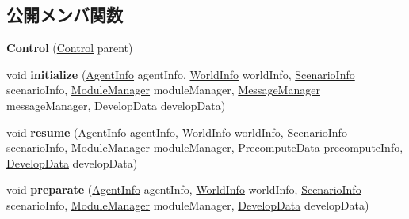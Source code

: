 \subsection*{公開メンバ関数}
\begin{DoxyCompactItemize}
\item 
\hypertarget{classadf_1_1component_1_1control_1_1Control_aeaab5064a2bfb271229b3b62a91c471c}{}\label{classadf_1_1component_1_1control_1_1Control_aeaab5064a2bfb271229b3b62a91c471c} 
{\bfseries Control} (\hyperlink{classadf_1_1component_1_1control_1_1Control}{Control} parent)
\item 
\hypertarget{classadf_1_1component_1_1control_1_1Control_a9107790ea778ff584c60b3939088d512}{}\label{classadf_1_1component_1_1control_1_1Control_a9107790ea778ff584c60b3939088d512} 
void {\bfseries initialize} (\hyperlink{classadf_1_1agent_1_1info_1_1AgentInfo}{Agent\+Info} agent\+Info, \hyperlink{classadf_1_1agent_1_1info_1_1WorldInfo}{World\+Info} world\+Info, \hyperlink{classadf_1_1agent_1_1info_1_1ScenarioInfo}{Scenario\+Info} scenario\+Info, \hyperlink{classadf_1_1agent_1_1module_1_1ModuleManager}{Module\+Manager} module\+Manager, \hyperlink{classadf_1_1agent_1_1communication_1_1MessageManager}{Message\+Manager} message\+Manager, \hyperlink{classadf_1_1agent_1_1develop_1_1DevelopData}{Develop\+Data} develop\+Data)
\item 
\hypertarget{classadf_1_1component_1_1control_1_1Control_ad9dfcd335a556fb0a3e3be9879a9656e}{}\label{classadf_1_1component_1_1control_1_1Control_ad9dfcd335a556fb0a3e3be9879a9656e} 
void {\bfseries resume} (\hyperlink{classadf_1_1agent_1_1info_1_1AgentInfo}{Agent\+Info} agent\+Info, \hyperlink{classadf_1_1agent_1_1info_1_1WorldInfo}{World\+Info} world\+Info, \hyperlink{classadf_1_1agent_1_1info_1_1ScenarioInfo}{Scenario\+Info} scenario\+Info, \hyperlink{classadf_1_1agent_1_1module_1_1ModuleManager}{Module\+Manager} module\+Manager, \hyperlink{classadf_1_1agent_1_1precompute_1_1PrecomputeData}{Precompute\+Data} precompute\+Info, \hyperlink{classadf_1_1agent_1_1develop_1_1DevelopData}{Develop\+Data} develop\+Data)
\item 
\hypertarget{classadf_1_1component_1_1control_1_1Control_a5cb4d26b41cd93b2a0ea06963c71fee5}{}\label{classadf_1_1component_1_1control_1_1Control_a5cb4d26b41cd93b2a0ea06963c71fee5} 
void {\bfseries preparate} (\hyperlink{classadf_1_1agent_1_1info_1_1AgentInfo}{Agent\+Info} agent\+Info, \hyperlink{classadf_1_1agent_1_1info_1_1WorldInfo}{World\+Info} world\+Info, \hyperlink{classadf_1_1agent_1_1info_1_1ScenarioInfo}{Scenario\+Info} scenario\+Info, \hyperlink{classadf_1_1agent_1_1module_1_1ModuleManager}{Module\+Manager} module\+Manager, \hyperlink{classadf_1_1agent_1_1develop_1_1DevelopData}{Develop\+Data} develop\+Data)

\end{DoxyCompactItemize}
